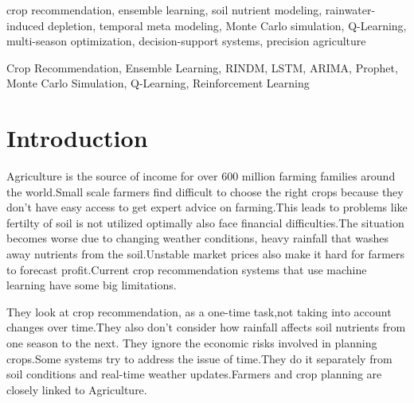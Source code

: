 \documentclass[conference]{IEEEtran}
\begin{document}
\begin{IEEEkeywords}
crop recommendation, ensemble learning, soil nutrient modeling, rainwater-induced depletion, temporal meta modeling, Monte Carlo simulation, Q-Learning, multi-season optimization, decision-support systems, precision agriculture
\end{IEEEkeywords}

\begin{IEEEkeywords}
Crop Recommendation, Ensemble Learning, RINDM, LSTM, ARIMA, Prophet,
Monte Carlo Simulation, Q-Learning, Reinforcement Learning
\end{IEEEkeywords}

\section{Introduction}
\label{sec:intro}

Agriculture is the source of income for over 600 million farming families around the world.Small scale farmers find difficult to choose the right crops because they don't have easy access to get expert advice on farming.This leads to problems like fertilty of soil is not utilized optimally also face financial difficulties.The situation becomes worse due to changing weather conditions, heavy rainfall that washes away nutrients from the soil.Unstable market prices also make it hard for farmers to forecast profit.Current crop recommendation systems that use machine learning have some big limitations.

They look at crop recommendation, as a one-time task,not taking into account changes over time.They also don't consider how rainfall affects soil nutrients from one season to the next.
They ignore the economic risks involved in planning crops.Some systems try to address the issue of time.They do it separately from soil conditions and real-time weather updates.Farmers and crop planning are closely linked to Agriculture.
\end{document}
